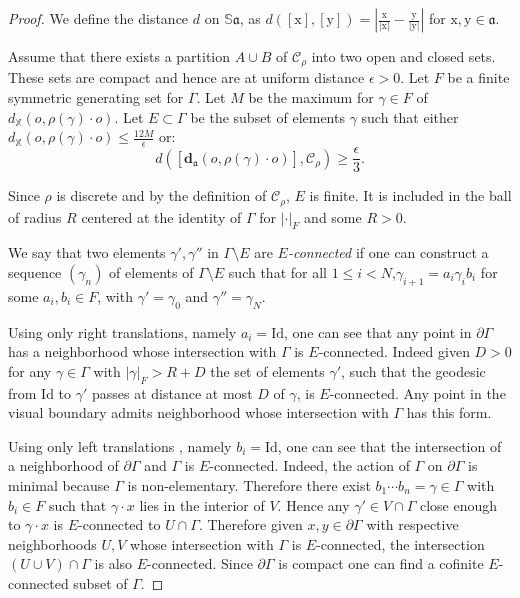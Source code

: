 \documentclass[reqno,10pt]{amsart}
\theoremstyle{plain}
\theoremstyle{definition}
\theoremstyle{remark}
\newcommand{\Sph}{\mathbb{S}}
\newcommand{\Id}{\text{Id}}
\newcommand{\da}{\mathbf{d}_{\mathfrak{a}}}
\newcommand{\X}{\mathbb{X}}
\newcommand{\ie}{namely }
\begin{document}
\begin{proof}
We define the distance $d$ on $\Sph\mathfrak{a}$, as $d([\mathrm{x}],[\mathrm{y}])=|\frac{\mathrm{x}}{|\mathrm{x}|}-\frac{\mathrm{y}}{|\mathrm{y}|}|$ for $\mathrm{x},\mathrm{y}\in \mathfrak{a}$.

\medskip

Assume that there exists a partition $A\cup B$ of $\mathcal{C}_\rho$ into two open and closed sets. These sets are  compact and hence are at uniform distance $\epsilon>0$.
Let $F$ be a finite symmetric generating set for $\Gamma$. Let $M$ be the maximum for $\gamma\in F$ of $d_\X(o,\rho(\gamma)\cdot o)$. Let $E\subset\Gamma$ be the subset of elements $\gamma$ such that either $d_\X(o,\rho(\gamma)\cdot o)\leq \frac{12M}{\epsilon}$ or:
 $$d(\left[\da(o,\rho(\gamma)\cdot o)\right],\mathcal{C}_\rho)\geq\frac{\epsilon}{3}.$$
 
 Since $\rho$ is discrete and by the definition of $\mathcal{C}_\rho$, $E$ is finite. It is included in the ball of radius $R$ centered at the identity of $\Gamma$ for $|\cdot|_F$ and some $R>0$.

\medskip

We say that two elements $\gamma',\gamma''$ in $\Gamma\setminus E$ are \emph{$E$-connected} if one can construct a sequence $(\gamma_n)$ of elements of $\Gamma\setminus E$ such that for all $1\leq i< N$,$\gamma_{i+1}=a_i\gamma_{i}b_i$ for some $a_i,b_i\in F$, with $\gamma'=\gamma_0$ and $\gamma''=\gamma_N$. 

\medskip

Using only right translations, \ie $a_i=\Id$, one can see that any point in $ \partial\Gamma$ has a neighborhood whose intersection with $\Gamma$ is $E$-connected. Indeed given $D>0$ for any $\gamma\in \Gamma$ with $|\gamma|_F> R+D$ the set of elements $\gamma'$, such that the geodesic from $\Id$ to $\gamma'$ passes at distance at most $D$ of $\gamma$, is $E$-connected. Any point in the visual boundary admits neighborhood whose intersection with $\Gamma$ has this form.


\medskip

Using only left translations , \ie $b_i=\Id$, one can see that the intersection of a neighborhood of $\partial \Gamma$ and $\Gamma$ is $E$-connected. Indeed, the action of $\Gamma$ on $\partial \Gamma$ is minimal because $\Gamma$ is non-elementary. Therefore there exist $b_1\cdots b_n=\gamma\in \Gamma$ with $b_i\in F$ such that $\gamma\cdot x$ lies in the interior of $V$. Hence any $\gamma'\in V\cap \Gamma$ close enough to $\gamma\cdot x$ is $E$-connected to $U\cap \Gamma$. 
Therefore given $x,y\in \partial \Gamma$ with respective neighborhoods $U,V$ whose intersection with $\Gamma$ is $E$-connected, the intersection $\left(U\cup V\right)\cap \Gamma$ is also $E$-connected.
Since $\partial \Gamma$ is compact one can find a cofinite $E$-connected subset of $\Gamma$.


\end{proof}
\end{document}
